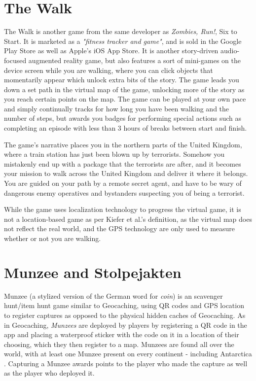 \section{The Walk}

The Walk is another game from the same developer as \emph{Zombies, Run!}, Six to Start. It is marketed as a \emph{"fitness tracker and game"}, and is sold in the Google Play Store as well as Apple's iOS App Store. It is another story-driven audio-focused augmented reality game, but also features a sort of mini-games on the device screen while you are walking, where you can click objects that momentarily appear which unlock extra bits of the story. The game leads you down a set path in the virtual map of the game, unlocking more of the story as you reach certain points on the map. The game can be played at your own pace and simply continually tracks for how long you have been walking and the number of steps, but awards you badges for performing special actions such as completing an episode with less than 3 hours of breaks between start and finish.

The game's narrative places you in the northern parts of the United Kingdom, where a train station has just been blown up by terrorists. Somehow you mistakenly end up with a package that the terrorists are after, and it becomes your mission to walk across the United Kingdom and deliver it where it belongs. You are guided on your path by a remote secret agent, and have to be wary of dangerous enemy operatives and bystanders suspecting you of being a terrorist.

While the game uses localization technology to progress the virtual game, it is not a location-based game as per Kiefer et al.'s definition, as the virtual map does not reflect the real world, and the GPS technology are only used to measure whether or not you are walking.

\section{Munzee and Stolpejakten}

Munzee (a stylized version of the German word for \emph{coin}) is an scavenger hunt/item hunt game similar to Geocaching, using QR codes and GPS location to register captures as opposed to the physical hidden caches of Geocaching. As in Geocaching, \emph{Munzees} are deployed by players by registering a QR code in the app and placing a waterproof sticker with the code on it in a location of their choosing, which they then register to a map. Munzees are found all over the world, with at least one Munzee present on every continent - including Antarctica \cite{munzee}. Capturing a Munzee awards points to the player who made the capture as well as the player who deployed it.

